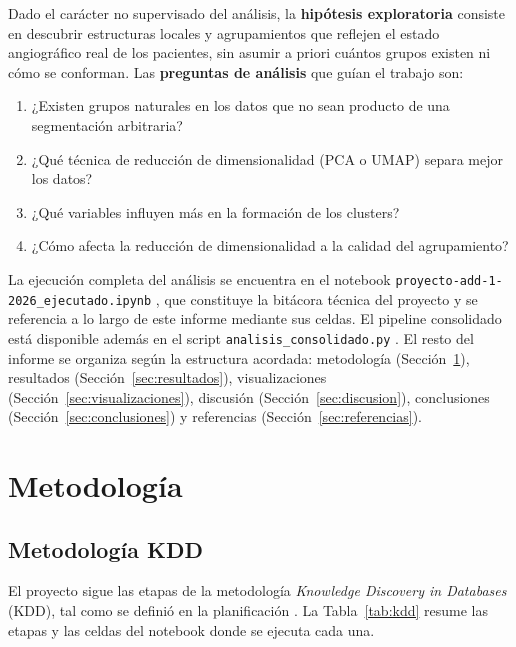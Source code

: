 \documentclass[11pt,a4paper]{article}
\begin{document}
Dado el carácter no supervisado del análisis, la \textbf{hipótesis exploratoria} consiste en
descubrir estructuras locales y agrupamientos que reflejen el estado angiográfico real de los
pacientes, sin asumir a priori cuántos grupos existen ni cómo se conforman. Las
\textbf{preguntas de análisis} que guían el trabajo son:

\begin{enumerate}
  \item ¿Existen grupos naturales en los datos que no sean producto de una segmentación arbitraria?
  \item ¿Qué técnica de reducción de dimensionalidad (PCA o UMAP) separa mejor los datos?
  \item ¿Qué variables influyen más en la formación de los clusters?
  \item ¿Cómo afecta la reducción de dimensionalidad a la calidad del agrupamiento?
\end{enumerate}

\begin{sloppypar}
La ejecución completa del análisis se encuentra en el notebook
\texttt{proyecto-add-1-2026\_ejecutado\allowbreak.ipynb} \cite{notebook}, que constituye la bitácora
técnica del proyecto y se referencia a lo largo de este informe mediante sus celdas. El
pipeline consolidado está disponible además en el script \texttt{analisis\_consolidado.py}
\cite{script}. El resto del informe se organiza según la estructura acordada: metodología
(Sección~\ref{sec:metodologia}), resultados (Sección~\ref{sec:resultados}),
visualizaciones (Sección~\ref{sec:visualizaciones}), discusión (Sección~\ref{sec:discusion}),
conclusiones (Sección~\ref{sec:conclusiones}) y referencias (Sección~\ref{sec:referencias}).
\end{sloppypar}

\section{Metodología}\label{sec:metodologia}

\subsection{Metodología KDD}

El proyecto sigue las etapas de la metodología \emph{Knowledge Discovery in Databases} (KDD),
tal como se definió en la planificación \cite{planificacion}. La Tabla~\ref{tab:kdd} resume
las etapas y las celdas del notebook donde se ejecuta cada una.
\end{document}
